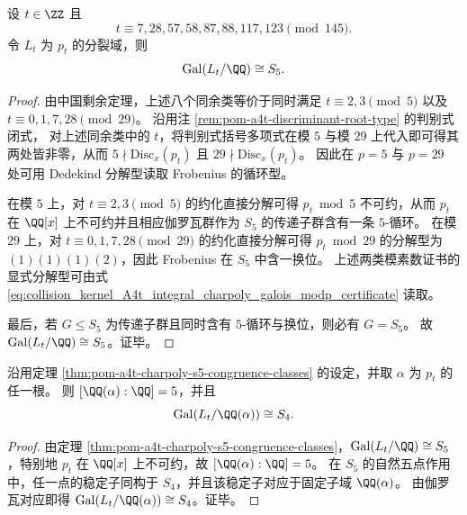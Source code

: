 \begin{theorem}\label{thm:pom-a4t-charpoly-s5-congruence-classes}
设 \(t\in\ZZ\) 且
\[
t\equiv 7,28,57,58,87,88,117,123 \pmod{145}.
\]
令 \(L_t\) 为 \(p_t\) 的分裂域，则
\[
\mathrm{Gal}(L_t/\QQ)\cong S_5.
\]
\end{theorem}
\begin{proof}
由中国剩余定理，上述八个同余类等价于同时满足
\(
t\equiv 2,3\pmod 5
\)
以及
\(
t\equiv 0,1,7,28\pmod{29}
\)。
沿用注 \ref{rem:pom-a4t-discriminant-root-type} 的判别式闭式，
对上述同余类中的 \(t\)，将判别式括号多项式在模 \(5\) 与模 \(29\) 上代入即可得其两处皆非零，从而 \(5\nmid \mathrm{Disc}_x(p_t)\) 且 \(29\nmid \mathrm{Disc}_x(p_t)\)。
因此在 \(p=5\) 与 \(p=29\) 处可用 Dedekind 分解型读取 Frobenius 的循环型。
\par
在模 \(5\) 上，对 \(t\equiv 2,3\pmod 5\) 的约化直接分解可得 \(p_t\bmod 5\) 不可约，从而 \(p_t\) 在 \(\QQ[x]\) 上不可约并且相应伽罗瓦群作为 \(S_5\) 的传递子群含有一条 \(5\)-循环。
在模 \(29\) 上，对 \(t\equiv 0,1,7,28\pmod{29}\) 的约化直接分解可得 \(p_t\bmod 29\) 的分解型为 \((1)(1)(1)(2)\)，因此 Frobenius 在 \(S_5\) 中含一换位。
上述两类模素数证书的显式分解型可由式 \eqref{eq:collision_kernel_A4t_integral_charpoly_galois_modp_certificate} 读取。
\par
最后，若 \(G\le S_5\) 为传递子群且同时含有 \(5\)-循环与换位，则必有 \(G=S_5\)。
故 \(\mathrm{Gal}(L_t/\QQ)\cong S_5\)。证毕。
\end{proof}

\begin{corollary}\label{cor:pom-a4t-charpoly-stabilizer-s4}
沿用定理 \ref{thm:pom-a4t-charpoly-s5-congruence-classes} 的设定，并取 \(\alpha\) 为 \(p_t\) 的任一根。
则 \([\QQ(\alpha):\QQ]=5\)，并且
\[
\mathrm{Gal}(L_t/\QQ(\alpha))\cong S_4.
\]
\end{corollary}
\begin{proof}
由定理 \ref{thm:pom-a4t-charpoly-s5-congruence-classes}，\(\mathrm{Gal}(L_t/\QQ)\cong S_5\)，特别地 \(p_t\) 在 \(\QQ[x]\) 上不可约，故 \([\QQ(\alpha):\QQ]=5\)。
在 \(S_5\) 的自然五点作用中，任一点的稳定子同构于 \(S_4\)，并且该稳定子对应于固定子域 \(\QQ(\alpha)\)。
由伽罗瓦对应即得 \(\mathrm{Gal}(L_t/\QQ(\alpha))\cong S_4\)。证毕。
\end{proof}

